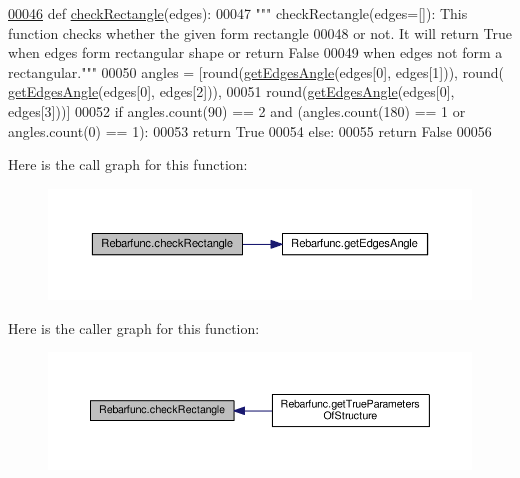 \begin{DoxyCode}
\hypertarget{namespaceRebarfunc.tex_l00046}{}\hyperlink{namespaceRebarfunc_a24ab60160ea54e86c0ce1b727621bf71}{00046} \textcolor{keyword}{def }\hyperlink{namespaceRebarfunc_a24ab60160ea54e86c0ce1b727621bf71}{checkRectangle}(edges):
00047     \textcolor{stringliteral}{""" checkRectangle(edges=[]): This function checks whether the given form rectangle}
00048 \textcolor{stringliteral}{        or not. It will return True when edges form rectangular shape or return False}
00049 \textcolor{stringliteral}{        when edges not form a rectangular."""}
00050     angles = [round(\hyperlink{namespaceRebarfunc_a3c75160aea4e3fd67b08c557e53a6910}{getEdgesAngle}(edges[0], edges[1])), round(
      \hyperlink{namespaceRebarfunc_a3c75160aea4e3fd67b08c557e53a6910}{getEdgesAngle}(edges[0], edges[2])),
00051             round(\hyperlink{namespaceRebarfunc_a3c75160aea4e3fd67b08c557e53a6910}{getEdgesAngle}(edges[0], edges[3]))]
00052     \textcolor{keywordflow}{if} angles.count(90) == 2 \textcolor{keywordflow}{and} (angles.count(180) == 1 \textcolor{keywordflow}{or} angles.count(0) == 1):
00053         \textcolor{keywordflow}{return} \textcolor{keyword}{True}
00054     \textcolor{keywordflow}{else}:
00055         \textcolor{keywordflow}{return} \textcolor{keyword}{False}
00056 
\end{DoxyCode}


Here is the call graph for this function\+:\nopagebreak
\begin{figure}[H]
\begin{center}
\leavevmode
\includegraphics[width=350pt]{namespaceRebarfunc_a24ab60160ea54e86c0ce1b727621bf71_cgraph}
\end{center}
\end{figure}




Here is the caller graph for this function\+:\nopagebreak
\begin{figure}[H]
\begin{center}
\leavevmode
\includegraphics[width=350pt]{namespaceRebarfunc_a24ab60160ea54e86c0ce1b727621bf71_icgraph}
\end{center}
\end{figure}


